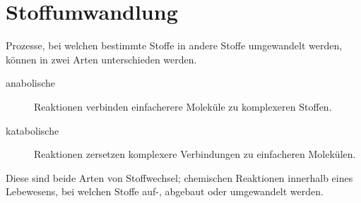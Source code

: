 \documentclass{article}
\begin{document}
\section{Stoffumwandlung} 
Prozesse, bei welchen bestimmte Stoffe in andere Stoffe umgewandelt werden, können in zwei Arten unterschieden werden.
\begin{description}
 \item[anabolische] Reaktionen verbinden einfacherere Moleküle zu komplexeren Stoffen.
 \item[katabolische] Reaktionen zersetzen komplexere Verbindungen zu einfacheren Molekülen. 
\end{description}
Diese sind beide Arten von Stoffwechsel; chemischen Reaktionen innerhalb eines Lebewesens, bei welchen Stoffe auf-, abgebaut oder umgewandelt werden.
\end{document}
